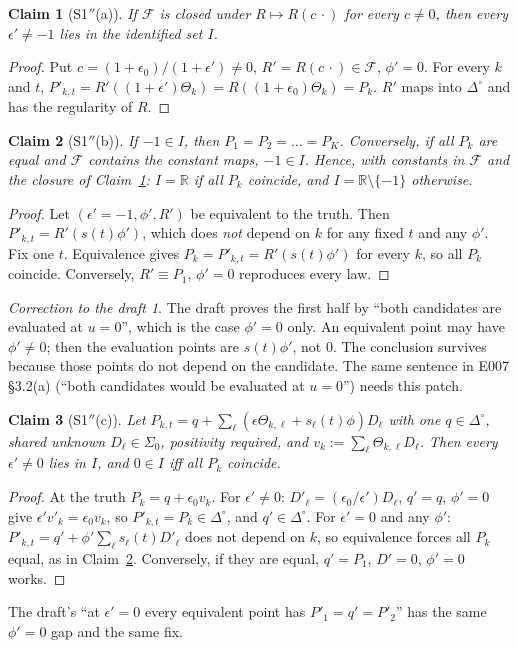 \documentclass[11pt,a4paper]{article}
\newtheorem{theorem}{Claim}
\theoremstyle{remark}
\newtheorem*{correction}{Correction to the draft}
\newcommand{\R}{\mathbb{R}}
\newcommand{\simp}{\Delta^{\circ}}
\newcommand{\eps}{\epsilon}
\begin{document}
\begin{theorem}[S1$''$(a)]\label{c:1}
If $\mathcal F$ is closed under $R\mapsto R(c\,\cdot)$ for every $c\neq0$, then every
$\eps'\neq-1$ lies in the identified set $I$.
\end{theorem}
\begin{proof}
Put $c=(1+\eps_0)/(1+\eps')\neq0$, $R'=R(c\,\cdot)\in\mathcal F$, $\phi'=0$. For every $k$
and $t$, $P'_{k,t}=R'((1+\eps')\Theta_k)=R((1+\eps_0)\Theta_k)=P_k$. $R'$ maps into $\simp$
and has the regularity of $R$.
\end{proof}

\begin{theorem}[S1$''$(b)]\label{c:2}
If $-1\in I$, then $P_1=P_2=\dots=P_K$. Conversely, if all $P_k$ are equal and $\mathcal F$
contains the constant maps, $-1\in I$. Hence, with constants in $\mathcal F$ and the closure
of Claim~\ref{c:1}: $I=\R$ if all $P_k$ coincide, and $I=\R\setminus\{-1\}$ otherwise.
\end{theorem}
\begin{proof}
Let $(\eps'=-1,\phi',R')$ be equivalent to the truth. Then
$P'_{k,t}=R'(s(t)\phi')$, which does \emph{not} depend on $k$ for any fixed $t$ and any
$\phi'$. Fix one $t$. Equivalence gives $P_k=P'_{k,t}=R'(s(t)\phi')$ for every $k$, so all
$P_k$ coincide. Conversely, $R'\equiv P_1$, $\phi'=0$ reproduces every law.
\end{proof}

\begin{correction}
The draft proves the first half by ``both candidates are evaluated at $u=0$'', which is the
case $\phi'=0$ only. An equivalent point may have $\phi'\neq0$; then the evaluation points
are $s(t)\phi'$, not $0$. The conclusion survives because those points do not depend on the
candidate. The same sentence in E007 §3.2(a) (``both candidates would be evaluated at
$u=0$'') needs this patch.
\end{correction}

\begin{theorem}[S1$''$(c)]\label{c:3}
Let $P_{k,t}=q+\sum_\ell(\eps\Theta_{k,\ell}+s_\ell(t)\phi)D_\ell$ with one $q\in\simp$,
shared unknown $D_\ell\in\Sigma_0$, positivity required, and $v_k:=\sum_\ell\Theta_{k,\ell}D_\ell$.
Then every $\eps'\neq0$ lies in $I$, and $0\in I$ iff all $P_k$ coincide.
\end{theorem}
\begin{proof}
At the truth $P_k=q+\eps_0v_k$. For $\eps'\neq0$: $D'_\ell=(\eps_0/\eps')D_\ell$, $q'=q$,
$\phi'=0$ give $\eps'v'_k=\eps_0v_k$, so $P'_{k,t}=P_k\in\simp$, and $q'\in\simp$.
For $\eps'=0$ and any $\phi'$: $P'_{k,t}=q'+\phi'\sum_\ell s_\ell(t)D'_\ell$ does not depend on
$k$, so equivalence forces all $P_k$ equal, as in Claim~\ref{c:2}. Conversely, if they are
equal, $q'=P_1$, $D'=0$, $\phi'=0$ works.
\end{proof}
\noindent The draft's ``at $\eps'=0$ every equivalent point has $P'_1=q'=P'_2$'' has the same
$\phi'=0$ gap and the same fix.
\end{document}
